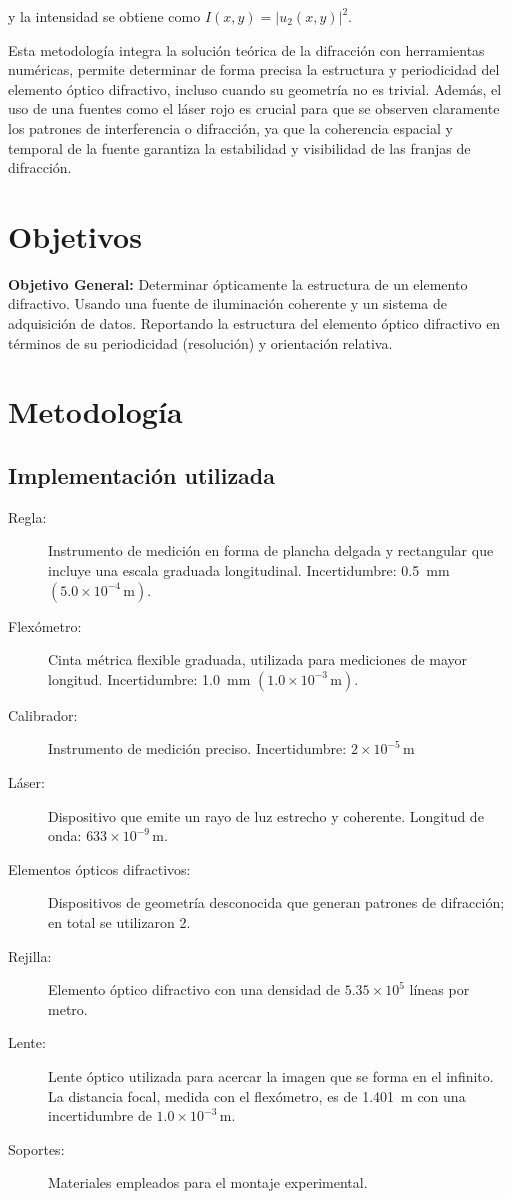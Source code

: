 \documentclass[6pt,a4paper]{article}
\begin{document}
y la intensidad se obtiene como \( I(x,y) = |u_2(x,y)|^2 \).

Esta metodología integra la solución teórica de la difracción con herramientas numéricas, permite determinar de forma precisa la estructura y periodicidad del elemento óptico difractivo, incluso cuando su geometría no es trivial. Además, el uso de una fuentes como el láser rojo es crucial para que se observen claramente los patrones de interferencia o difracción, ya que la coherencia espacial y temporal de la fuente garantiza la estabilidad y visibilidad de las franjas de difracción.

\section{Objetivos}

\textbf{Objetivo General:}
Determinar ópticamente la estructura de un elemento difractivo. Usando una fuente de
iluminación coherente y un sistema de adquisición de datos. Reportando la estructura del elemento óptico
difractivo en términos de su periodicidad (resolución) y orientación relativa.

\section{Metodología}

\subsection{Implementación utilizada}  
\begin{description}  
    \item[Regla:] Instrumento de medición en forma de plancha delgada y rectangular que incluye una escala graduada longitudinal. Incertidumbre: 0.5~mm \((5.0 \times 10^{-4} \, \text{m})\).  
    \item[Flexómetro:] Cinta métrica flexible graduada, utilizada para mediciones de mayor longitud. Incertidumbre: 1.0~mm \((1.0 \times 10^{-3} \, \text{m})\).  
    \item[Calibrador:] Instrumento de medición preciso. Incertidumbre: $2 \times 10^{-5} \, \text{m}$
    \item[Láser:] Dispositivo que emite un rayo de luz estrecho y coherente. Longitud de onda: \( 633 \times 10^{-9} \, \text{m} \).  
    \item[Elementos ópticos difractivos:] Dispositivos de geometría desconocida que generan patrones de difracción; en total se utilizaron 2.  
    \item[Rejilla:] Elemento óptico difractivo con una densidad de \(5.35 \times 10^5\) líneas por metro.  
    \item[Lente:] Lente óptico utilizada para acercar la imagen que se forma en el infinito. La distancia focal, medida con el flexómetro, es de 1.401~m con una incertidumbre de \(1.0 \times 10^{-3} \, \text{m}\).  
    \item[Soportes:] Materiales empleados para el montaje experimental.  
\end{description}  
\end{document}
